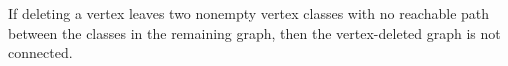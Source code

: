 If deleting a vertex leaves two nonempty vertex classes with no reachable path between
the classes in the remaining graph, then the vertex-deleted graph is not connected.
